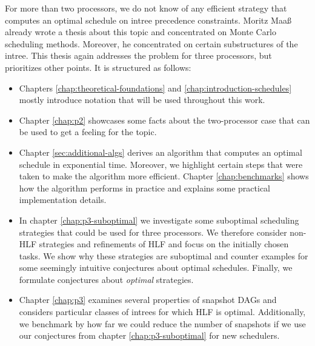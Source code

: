 For more than two processors, we do not know of any efficient strategy that computes an optimal schedule on intree precedence constraints. Moritz Maaß already wrote a thesis about this topic \cite{MoritzMaasDiploma} and concentrated on Monte Carlo scheduling methods. Moreover, he concentrated on certain substructures of the intree. This thesis again addresses the problem for three processors, but prioritizes other points. It is structured as follows:

\begin{itemize}
\item Chapters \ref{chap:theoretical-foundations} and \ref{chap:introduction-schedules} mostly introduce notation that will be used throughout this work. 
\item Chapter \ref{chap:p2} showcases some facts about the two-processor case that can be used to get a feeling for the topic.
\item Chapter \ref{sec:additional-algs} derives an algorithm that computes an optimal schedule in exponential time. Moreover, we highlight certain steps that were taken to make the algorithm more efficient. Chapter \ref{chap:benchmarks} shows how the algorithm performs in practice and explains some practical implementation details.
\item In chapter \ref{chap:p3-suboptimal} we investigate some suboptimal scheduling strategies that could be used for three processors. We therefore consider non-HLF strategies and refinements of HLF and focus on the initially chosen tasks. We show why these strategies are suboptimal and counter examples for some seemingly intuitive conjectures about optimal schedules. Finally, we formulate conjectures about \emph{optimal} strategies.
\item Chapter \ref{chap:p3} examines several properties of snapshot DAGs and considers particular classes of intrees for which HLF is optimal. Additionally, we benchmark by how far we could reduce the number of snapshots if we use our conjectures from chapter \ref{chap:p3-suboptimal} for new schedulers.
\end{itemize}

